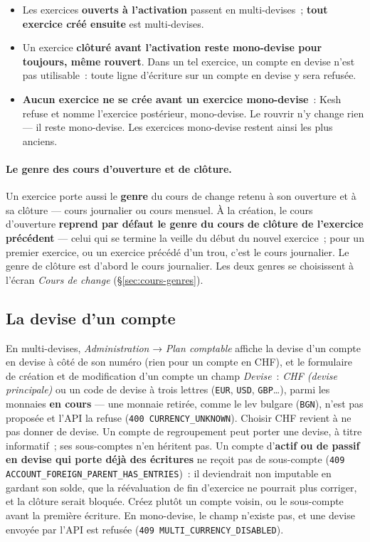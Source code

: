 \documentclass[a4paper,11pt,oneside]{article}
\begin{document}
\begin{itemize}
    \item Les exercices \textbf{ouverts à l'activation} passent en multi-devises~; \textbf{tout exercice créé ensuite} est multi-devises.
    \item Un exercice \textbf{clôturé avant l'activation reste mono-devise pour toujours, même rouvert}. Dans un tel exercice, un compte en devise n'est pas utilisable~: toute ligne d'écriture sur un compte en devise y sera refusée.
    \item \textbf{Aucun exercice ne se crée avant un exercice mono-devise}~: Kesh refuse et nomme l'exercice postérieur, mono-devise. Le rouvrir n'y change rien --- il reste mono-devise. Les exercices mono-devise restent ainsi les plus anciens.
\end{itemize}

\paragraph{Le genre des cours d'ouverture et de clôture.} Un exercice porte aussi le \textbf{genre} du cours de change retenu à son ouverture et à sa clôture --- cours journalier ou cours mensuel. À la création, le cours d'ouverture \textbf{reprend par défaut le genre du cours de clôture de l'exercice précédent} --- celui qui se termine la veille du début du nouvel exercice~; pour un premier exercice, ou un exercice précédé d'un trou, c'est le cours journalier. Le genre de clôture est d'abord le cours journalier. Les deux genres se choisissent à l'écran \emph{Cours de change} (\S\ref{sec:cours-genres}).

\subsection{La devise d'un compte}\label{sec:devise-compte}

En multi-devises, \emph{Administration} → \emph{Plan comptable} affiche la devise d'un compte en devise à côté de son numéro (rien pour un compte en CHF), et le formulaire de création et de modification d'un compte un champ \emph{Devise}~: \emph{CHF (devise principale)} ou un code de devise à trois lettres (\texttt{EUR}, \texttt{USD}, \texttt{GBP}\ldots), parmi les monnaies \textbf{en cours} --- une monnaie retirée, comme le lev bulgare (\texttt{BGN}), n'est pas proposée et l'API la refuse (\texttt{400 CURRENCY\_\allowbreak UNKNOWN}). Choisir CHF revient à ne pas donner de devise. Un compte de regroupement peut porter une devise, à titre informatif~; ses sous-comptes n'en héritent pas. Un compte d'\textbf{actif ou de passif en devise qui porte déjà des écritures} ne reçoit pas de sous-compte (\texttt{409 ACCOUNT\_\allowbreak FOREIGN\_\allowbreak PARENT\_\allowbreak HAS\_\allowbreak ENTRIES})~: il deviendrait non imputable en gardant son solde, que la réévaluation de fin d'exercice ne pourrait plus corriger, et la clôture serait bloquée. Créez plutôt un compte voisin, ou le sous-compte avant la première écriture. En mono-devise, le champ n'existe pas, et une devise envoyée par l'API est refusée (\texttt{409 MULTI\_\allowbreak CURRENCY\_\allowbreak DISABLED}).
\end{document}
